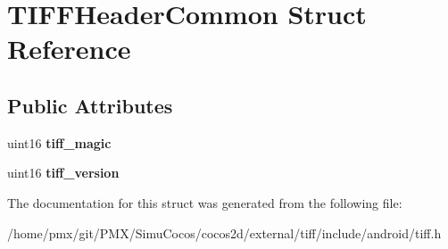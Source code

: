 \hypertarget{structTIFFHeaderCommon}{}\section{T\+I\+F\+F\+Header\+Common Struct Reference}
\label{structTIFFHeaderCommon}
\subsection*{Public Attributes}
\begin{DoxyCompactItemize}
\item 
\mbox{\label{structTIFFHeaderCommon_a40af49020890afdc649f1a46f9ed5d52}} 
uint16 {\bfseries tiff\+\_\+magic}
\item 
\mbox{\label{structTIFFHeaderCommon_a0f73f5dc2b30c57881857e0cccf05e70}} 
uint16 {\bfseries tiff\+\_\+version}
\end{DoxyCompactItemize}


The documentation for this struct was generated from the following file\+:\begin{DoxyCompactItemize}
\item 
/home/pmx/git/\+P\+M\+X/\+Simu\+Cocos/cocos2d/external/tiff/include/android/tiff.\+h\end{DoxyCompactItemize}
